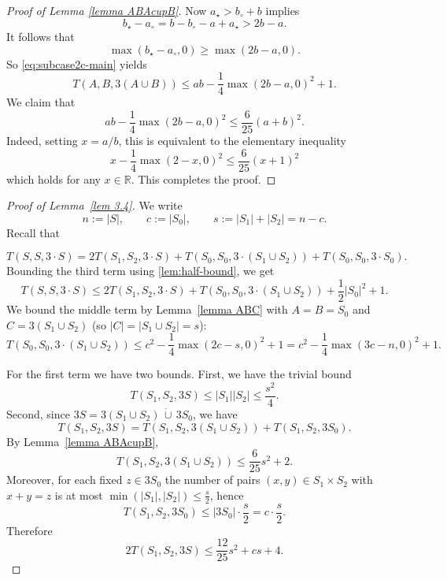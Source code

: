 \documentclass[12pt, notitlepage]{amsart}
\numberwithin{equation}{section}
\theoremstyle{remark}
\theoremstyle{definition}
\theoremstyle{remark}
\numberwithin{equation}{section}
\begin{document}
\begin{proof}[Proof of Lemma \ref{lemma ABAcupB}]
Now $a_{\star}>b_{\circ}+b$ implies
\[
b_{\star}-a_{\circ}
=
b-b_{\circ}-a+a_{\star}
>
2b-a.
\]
It follows that
\[
\max(b_{\star}-a_{\circ},0)\ge \max(2b-a,0).
\]
So \eqref{eq:subcase2c-main} yields
\[
T(A,B,3(A\cup B))
\le
ab-\frac14\max(2b-a,0)^2+1.
\]
We claim that
\[
ab-\frac14\max(2b-a,0)^2\le \frac6{25}(a+b)^2.
\]
Indeed, setting $x = a / b$, this is equivalent to the elementary inequality
$$x - \frac{1}{4}\max\left(2 - x, 0\right)^{2} \leq \frac{6}{25}\left(x + 1\right)^{2}$$
which holds for any $x \in \mathbb{R}$. This completes the proof.
\end{proof}






\begin{proof}[Proof of Lemma~\ref{lem 3.4}]
We write
$$
n:=|S|,\qquad c:=|S_0|,\qquad s:=|S_1|+|S_2|=n-c.
$$
Recall that

$$T(S, S, 3 \cdot S) = 2 T(S_1, S_2, 3 \cdot S) + T(S_0, S_0, 3 \cdot (S_1 \cup S_2)) + T(S_0, S_0, 3 \cdot S_0).
$$
Bounding the third term using \cref{lem:half-bound}, we get
\begin{equation}
\label{eq:full}T(S, S, 3 \cdot S) \leq 2 T(S_1, S_2, 3 \cdot S) + T(S_0, S_0, 3 \cdot (S_1 \cup S_2)) + \frac{1}{2} |S_0|^2 + 1.
\end{equation}
We bound the middle term by Lemma~\ref{lemma ABC} with $A=B=S_0$ and $C=3(S_1\cup S_2)$ (so $|C|=|S_1\cup S_2|=s$):
\begin{equation}
\label{eq:middle}
T(S_0,S_0,3 \cdot (S_1\cup S_2))
\le c^2-\frac14\max(2c-s,0)^2+1
=c^2-\frac14\max(3c-n,0)^2+1.
\end{equation}

For the first term we have two bounds.
First, we have the trivial bound
\begin{equation}
\label{eq:trivial-first}
T(S_1,S_2,3S)\le |S_1||S_2| \leq \frac{s^2}{4}.
\end{equation}
Second, since $3S=3(S_1\cup S_2)\,\dot\cup\, 3S_0$, we have
\[
T(S_1,S_2,3S)=T(S_1,S_2,3(S_1\cup S_2))+T(S_1,S_2,3S_0).
\]
By Lemma~\ref{lemma ABAcupB},
\[
T(S_1,S_2,3(S_1\cup S_2))\le \frac{6}{25}s^2+2.
\]
Moreover, for each fixed $z\in 3S_0$ the number of pairs $(x,y)\in S_1\times S_2$ with $x+y=z$ is at most
$\min(|S_1|,|S_2|)\le \frac{s}{2}$, hence
\[
T(S_1,S_2,3S_0)\le |3S_0|\cdot \frac{s}{2}=c\cdot \frac{s}{2}.
\]
Therefore
\begin{equation}
\label{eq:aba-first}
2T(S_1,S_2,3S)\le \frac{12}{25}s^2+cs+4.
\end{equation}


\end{proof}
\end{document}
